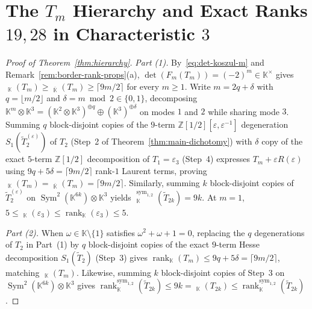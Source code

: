 \documentclass[11pt,reqno]{amsart}
\theoremstyle{definition}
\theoremstyle{remark}
\numberwithin{equation}{section}
\newcommand{\KK}{\mathbb{K}}
\newcommand{\ZZ}{\mathbb{Z}}
\DeclareMathOperator{\rk}{rank}
\DeclareMathOperator{\brk}{\underline{rank}}
\DeclareMathOperator{\Sym}{Sym}
\begin{document}
\section{The \texorpdfstring{$T_m$}{Tm} Hierarchy and Exact Ranks \texorpdfstring{$19, 28$}{19, 28} in Characteristic \texorpdfstring{$3$}{3}}\label{sec:hierarchy}

\begin{proof}[Proof of Theorem~\ref{thm:hierarchy}]
\emph{Part (1).} By~\eqref{eq:det-koszul-m} and Remark~\ref{rem:border-rank-props}(a), $\det(F_m(T_m)) = (-2)^m \in \KK^\times$ gives $\brk_{\KK}(T_m) \ge \brk_{\overline{\KK}}(T_m) \ge \lceil 9m/2 \rceil$ for every $m \ge 1$. Write $m = 2q + \delta$ with $q = \lfloor m/2 \rfloor$ and $\delta = m \bmod 2 \in \{0, 1\}$, decomposing $\KK^m \otimes \KK^3 = (\KK^2 \otimes \KK^3)^{\oplus q} \oplus (\KK^3)^{\oplus \delta}$ on modes $1$ and $2$ while sharing mode $3$. Summing $q$ block-disjoint copies of the $9$-term $\ZZ[1/2][\varepsilon, \varepsilon^{-1}]$ degeneration $S_1(\widetilde{T}_2^{(\varepsilon)})$ of $T_2$ (Step~2 of Theorem~\ref{thm:main-dichotomy}) with $\delta$ copy of the exact $5$-term $\ZZ[1/2]$ decomposition of $T_1 = \varepsilon_3$ (Step~4) expresses $T_m + \varepsilon R(\varepsilon)$ using $9q + 5\delta = \lceil 9m/2 \rceil$ rank-$1$ Laurent terms, proving $\brk_{\KK}(T_m) = \brk_{\overline{\KK}}(T_m) = \lceil 9m/2 \rceil$. Similarly, summing $k$ block-disjoint copies of $\widetilde{T}_2^{(\varepsilon)}$ on $\Sym^2(\KK^{6k}) \otimes \KK^3$ yields $\brk_{\KK}^{\mathrm{sym}_{1,2}}(\widetilde{T}_{2k}) = 9k$. At $m = 1$, $5 \le \brk_{\KK}(\varepsilon_3) \le \rk_{\KK}(\varepsilon_3) \le 5$.

\emph{Part (2).} When $\omega \in \KK\setminus\{1\}$ satisfies $\omega^2 + \omega + 1 = 0$, replacing the $q$ degenerations of $T_2$ in Part~(1) by $q$ block-disjoint copies of the exact $9$-term Hesse decomposition $S_1(\widetilde{T}_2)$ (Step~3) gives $\rk_{\KK}(T_m) \le 9q + 5\delta = \lceil 9m/2 \rceil$, matching $\brk_{\KK}(T_m)$. Likewise, summing $k$ block-disjoint copies of Step~3 on $\Sym^2(\KK^{6k}) \otimes \KK^3$ gives $\rk_{\KK}^{\mathrm{sym}_{1,2}}(\widetilde{T}_{2k}) \le 9k = \brk_{\KK}(T_{2k}) \le \rk_{\KK}^{\mathrm{sym}_{1,2}}(\widetilde{T}_{2k})$.


\end{proof}
\end{document}
